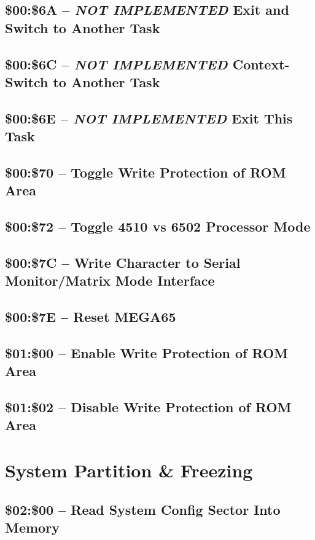 \subsection{\$00:\$6A -- {\em NOT IMPLEMENTED} Exit and Switch to Another Task}
\subsection{\$00:\$6C -- {\em NOT IMPLEMENTED} Context-Switch to Another Task}
\subsection{\$00:\$6E -- {\em NOT IMPLEMENTED} Exit This Task}

\subsection{\$00:\$70 -- Toggle Write Protection of ROM Area}
\subsection{\$00:\$72 -- Toggle 4510 vs 6502 Processor Mode}
\subsection{\$00:\$7C -- Write Character to Serial Monitor/Matrix Mode Interface}
\subsection{\$00:\$7E -- Reset MEGA65}

\subsection{\$01:\$00 -- Enable Write Protection of ROM Area}
\subsection{\$01:\$02 -- Disable Write Protection of ROM Area}

\section{System Partition \& Freezing}

\subsection{\$02:\$00 -- Read System Config Sector Into Memory}
